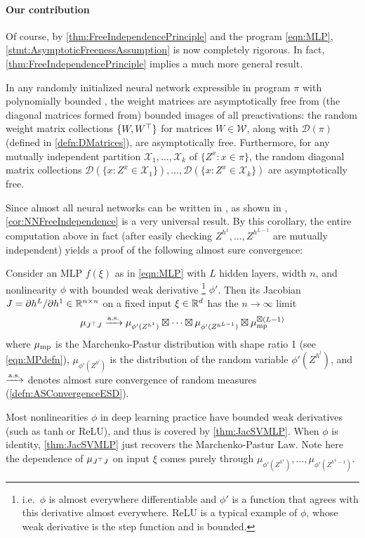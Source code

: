 \documentclass[main.tex]{subfiles}
\begin{document}
\paragraph*{Our contribution}

Of course, by \cref{thm:FreeIndependencePrinciple} and the \netsort{} program \cref{eqn:MLP}, \cref{stmt:AsymptoticFreenessAssumption} is now completely rigorous.
In fact, \cref{thm:FreeIndependencePrinciple} implies a much more general result.
\begin{cor}
\label{cor:NNFreeIndependence}
In any randomly initialized neural network expressible in \netsort{} program $\pi$ with polynomially bounded , the weight matrices are asymptotically free from (the diagonal matrices formed from) bounded images of all preactivations:
the random weight matrix collections $\{W,W^{\top}\}$ for matrices $W \in \mathcal W$, along with $\mathcal D(\pi)$ (defined in \cref{defn:DMatrices}), are asymptotically free. Furthermore, for any mutually independent partition $\mathcal{X}_{1},\ldots,\mathcal{X}_{k}$ of $\{Z^{x}:x\in\pi\}$, the random diagonal matrix collections
$\mathcal D(\{x: Z^{x}\in\mathcal{X}_{1}\}),\ldots,\mathcal D(\{x:Z^{x}\in\mathcal{X}_{k}\})$
are asymptotically free.
\end{cor}
Since almost all neural networks can be written in \netsort{}, as shown in \citet{yangTP1,yangTP2}, \cref{cor:NNFreeIndependence} is a very universal result.
By this corollary, the entire computation above in fact (after easily checking $Z^{h^{1}},\ldots,Z^{h^{L-1}}$ are mutually independent) yields a proof of the following almost sure convergence:
\begin{thm}\label{thm:JacSVMLP}
    Consider an MLP $f(\xi)$ as in \cref{eqn:MLP} with $L$ hidden layers, width $n$, and nonlinearity $\phi$ with bounded weak derivative%
    \footnote{i.e.\ $\phi$ is almost everywhere differentiable and $\phi'$ is a function that agrees with this derivative almost everywhere. ReLU is a typical example of $\phi$, whose weak derivative is the step function and is bounded.}
     $\phi'$.
Then its Jacobian $J=\partial h^L/\partial {h^1} \in \mathbb{R}^{n\times n}$ on a fixed input $\xi \in \mathbb{R}^d$ has the $n\to\infty$ limit
\[
\mu_{J^{\top}J}\xrightarrow{\mathrm{a.s.}}\mu_{\phi'(Z^{h^{1}})}\boxtimes\cdots\boxtimes\mu_{\phi'(Z^{h^{L-1}})}\boxtimes\mu_{\mathrm{mp}}^{\boxtimes(L-1)}
\]
where $\mu_{\mathrm{mp}}$ is the Marchenko-Pastur distribution with shape ratio 1 (see \cref{eqn:MPdefn}), $\mu_{\phi'(Z^{h^{l}})}$ is the distribution of the random variable $\phi'(Z^{h^{l}})$, and $\xrightarrow{\mathrm{a.s.}}$ denotes almost sure convergence of random measures (\cref{defn:ASConvergenceESD}).

\end{thm}
Most nonlinearities $\phi$ in deep learning practice have bounded weak derivatives (such as tanh or ReLU), and thus is covered by \cref{thm:JacSVMLP}.
When $\phi$ is identity, \cref{thm:JacSVMLP} just recovers the Marchenko-Pastur Law.
Note here the dependence of $\mu_{J^\top J}$ on input $\xi$ comes purely through $\mu_{\phi'(Z^{h^1})}, \ldots, \mu_{\phi'(Z^{h^L-1})}$.
\end{document}
